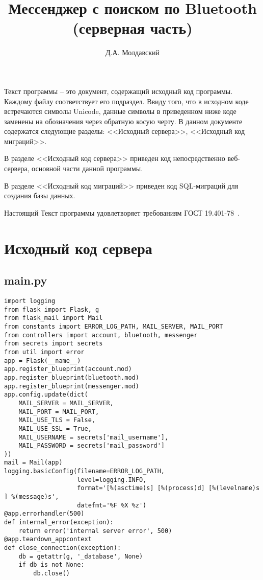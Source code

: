\documentclass[listing]{espd}
\author{Д.А. Молдавский}
\title{Мессенджер с поиском по Bluetooth\\(серверная часть)}
\begin{document}
\annotation

Текст программы -- это документ, содержащий исходный код программы. Каждому файлу соответствует его подраздел. Ввиду того, что в исходном коде встречаются символы Unicode, данные символы в приведенном ниже коде заменены на обозначения через обратную косую черту. В данном документе содержатся следующие разделы: <<Исходный сервера>>, <<Исходный код миграций>>.

В разделе <<Исходный код сервера>> приведен код непосредственно веб-сервера, основной части данной программы.

В разделе <<Исходный код миграций>> приведен код SQL-миграций для создания базы данных.

Настоящий Текст программы удовлетворяет требованиям ГОСТ 19.401-78~\cite{espd401}.

\tableofcontents
\section{Исходный код сервера}

\subsection{main.py}
\begin{verbatim}
import logging
from flask import Flask, g
from flask_mail import Mail
from constants import ERROR_LOG_PATH, MAIL_SERVER, MAIL_PORT
from controllers import account, bluetooth, messenger
from secrets import secrets
from util import error
app = Flask(__name__)
app.register_blueprint(account.mod)
app.register_blueprint(bluetooth.mod)
app.register_blueprint(messenger.mod)
app.config.update(dict(
    MAIL_SERVER = MAIL_SERVER,
    MAIL_PORT = MAIL_PORT,
    MAIL_USE_TLS = False,
    MAIL_USE_SSL = True,
    MAIL_USERNAME = secrets['mail_username'],
    MAIL_PASSWORD = secrets['mail_password']
))
mail = Mail(app)
logging.basicConfig(filename=ERROR_LOG_PATH,
                    level=logging.INFO,
                    format='[%(asctime)s] [%(process)d] [%(levelname)s
] %(message)s',
                    datefmt='%F %X %z')
@app.errorhandler(500)
def internal_error(exception):
    return error('internal server error', 500)
@app.teardown_appcontext
def close_connection(exception):
    db = getattr(g, '_database', None)
    if db is not None:
        db.close()
\end{verbatim}
\end{document}

